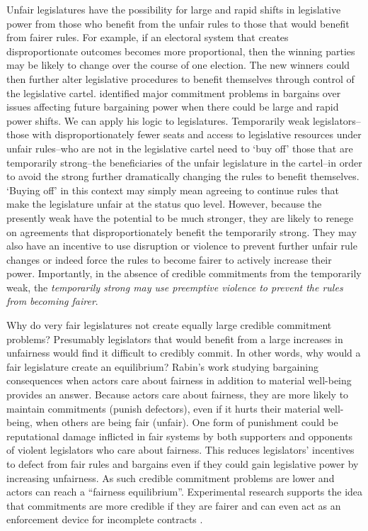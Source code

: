 \documentclass[a4paper]{article}\usepackage[]{graphicx}\usepackage[]{color}
\begin{document}
Unfair legislatures have the possibility for large and rapid shifts in legislative power from those who benefit from the unfair rules to those that would benefit from fairer rules. For example, if an electoral system that creates disproportionate outcomes becomes more proportional, then the winning parties may be likely to change over the course of one election. The new winners could then further alter legislative procedures to benefit themselves through control of the legislative cartel. \cite{Powell2004,Powell2006} identified major commitment problems in bargains over issues affecting future bargaining power when there could be large and rapid power shifts. We can apply his logic to legislatures. Temporarily weak legislators--those with disproportionately fewer seats and access to legislative resources under unfair rules--who are not in the legislative cartel need to `buy off' those that are temporarily strong--the beneficiaries of the unfair legislature in the cartel--in order to avoid the strong further dramatically changing the rules to benefit themselves. `Buying off' in this context may simply mean agreeing to continue rules that make the legislature unfair at the status quo level. However, because the presently weak have the potential to be much stronger, they are likely to renege on agreements that disproportionately benefit the temporarily strong. They may also have an incentive to use disruption or violence to prevent further unfair rule changes or indeed force the rules to become fairer to actively increase their power. Importantly, in the absence of credible commitments from the temporarily weak, the \emph{temporarily strong may use preemptive violence to prevent the rules from becoming fairer}.

Why do very fair legislatures not create equally large credible commitment problems? Presumably legislators that would benefit from a large increases in unfairness would find it difficult to credibly commit. In other words, why would a fair legislature create an equilibrium? Rabin's \citeyearpar{Rabin1993} work studying bargaining consequences when actors care about fairness in addition to material well-being provides an answer. Because actors care about fairness, they are more likely to maintain commitments (punish defectors), even if it hurts their material well-being, when others are being fair (unfair). One form of punishment could be reputational damage inflicted in fair systems by both supporters and opponents of violent legislators who care about fairness. This reduces legislators' incentives to defect from fair rules and bargains even if they could gain legislative power by increasing unfairness. As such credible commitment problems are lower and actors can reach a ``fairness equilibrium''. Experimental research supports the idea that commitments are more credible if they are fairer \citep{Ellingsen2004} and can even act as an enforcement device for incomplete contracts \citep[see][for a review]{Fehr2008}.
\end{document}
